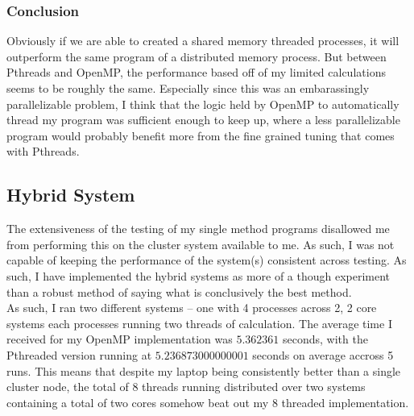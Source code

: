 \documentclass{article}
\begin{document}
\subsubsection*{Conclusion}
Obviously if we are able to created a shared memory threaded processes, it will outperform the same program of a distributed memory process. But between Pthreads and OpenMP, the performance based off of my limited calculations seems to be roughly the same. Especially since this was an embarassingly parallelizable problem, I think that the logic held by OpenMP to automatically thread my program was sufficient enough to keep up, where a less parallelizable program would probably benefit more from the fine grained tuning that comes with Pthreads.
\subsection*{Hybrid System}
The extensiveness of the testing of my single method programs disallowed me from performing this on the cluster system available to me. As such, I was not capable of keeping the performance of the system(s) consistent across testing. As such, I have implemented the hybrid systems as more of a though experiment than a robust method of saying what is conclusively the best method.\\
As such, I ran two different systems -- one with 4 processes across 2, 2 core systems each processes running two threads of calculation. The average time I received for my OpenMP implementation was $5.362361$ seconds, with the Pthreaded version running at $5.236873000000001$ seconds on average accross 5 runs. This means that despite my laptop being consistently better than a single cluster node, the total of 8 threads running distributed over two systems containing a total of two cores somehow beat out my 8 threaded implementation.
\end{document}
